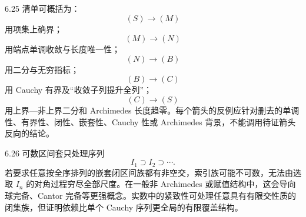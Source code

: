 \begin{solution}{6.25}
清单可概括为：
\[
 (S)\to(M)
\]
用项集上确界；
\[
 (M)\to(N)
\]
用端点单调收敛与长度唯一性；
\[
 (N)\to(B)
\]
用二分与无穷指标；
\[
 (B)\to(C)
\]
用 Cauchy 有界及“收敛子列提升全列”；
\[
 (C)\to(S)
\]
用上界—非上界二分和 Archimedes 长度趋零。每个箭头的反例应针对删去的单调性、有界性、闭性、嵌套性、Cauchy 性或 Archimedes 背景，不能调用待证箭头反向的结论。
\end{solution}

\begin{solution}{6.26}
可数区间套只处理序列
\[
 I_1\supset I_2\supset\cdots.
\]
若要求任意按全序排列的嵌套闭区间族都有非空交，索引族可能不可数，无法由选取 \(I_n\) 的对角过程穷尽全部尺度。在一般非 Archimedes 或赋值结构中，这会导向球完备、Cantor 完备等更强概念。实数中的紧致性可处理任意具有有限交性质的闭集族，但证明依赖比单个 Cauchy 序列更全局的有限覆盖结构。
\end{solution}

